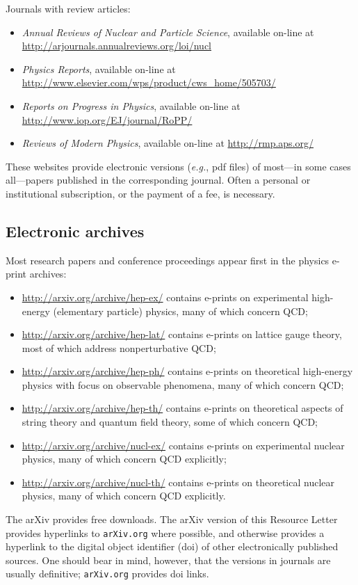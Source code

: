 \documentclass[prb,groupedaddress,nofootinbib,showpacs,twocolumn,floatfix]{revtex4}
\newcommand{\eg}{{\em e.g.}}
\begin{document}
Journals with review articles:
\begin{itemize}
	\item \emph{Annual Reviews of Nuclear and Particle Science}, 
	available on-line at 
	\url{http://arjournals.annualreviews.org/loi/nucl}
	\item \emph{Physics Reports}, available on-line at 
	\url{http://www.elsevier.com/wps/product/cws_home/505703/}
	\item \emph{Reports on Progress in Physics}, available on-line at 
	\url{http://www.iop.org/EJ/journal/RoPP/}
	\item \emph{Reviews of Modern Physics}, available on-line at 
	\url{http://rmp.aps.org/}
\end{itemize}

These websites provide electronic versions (\eg, pdf files) of
most---in some cases all---papers published in the corresponding journal.
Often a personal or institutional subscription, or the payment of a fee, 
is necessary.

\subsection{Electronic archives}
Most research papers and conference proceedings appear first in the 
physics e-print archives:
\begin{itemize}
	\item \url{http://arxiv.org/archive/hep-ex/} contains e-prints on 
	experimental high-energy (elementary particle) physics, many of 
	which concern QCD;
	\item \url{http://arxiv.org/archive/hep-lat/} contains e-prints on 
	lattice gauge theory, most of which address nonperturbative QCD;
	\item \url{http://arxiv.org/archive/hep-ph/} contains e-prints on 
	theoretical high-energy physics with focus on observable phenomena, 
	many of which concern QCD;
	\item \url{http://arxiv.org/archive/hep-th/} contains e-prints on 
	theoretical aspects of string theory and quantum field theory,
	some of which concern QCD;
	\item \url{http://arxiv.org/archive/nucl-ex/} contains e-prints on 
	experimental nuclear physics, many of which concern QCD explicitly;
	\item \url{http://arxiv.org/archive/nucl-th/} contains e-prints on 
	theoretical nuclear physics, many of which concern QCD explicitly.
\end{itemize}
The arXiv provides free downloads.
The arXiv version of this Resource Letter provides hyperlinks to 
\texttt{arXiv.org} where possible, and otherwise provides a hyperlink
to the digital object identifier (doi) of other electronically 
published sources.
One should bear in mind, however, that the versions in journals are 
usually definitive; \texttt{arXiv.org} provides doi links.
\end{document}
